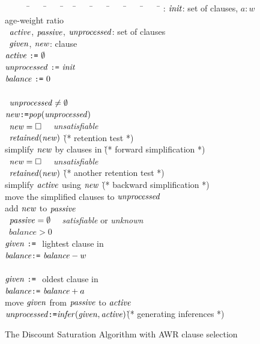 \documentclass{llncs}
\newcommand{\Balance}{\ensuremath{\mathit{balance}}}
\begin{document}
\begin{figure}
\begin{tabbing}
~~~~~~\=~~~~\=~~~~\=~~~\=~~~~\=~~~~\=~~~~\=~~~~\=~~~~\=\kill
\>\INPUT: $\mathit{init}$: set of clauses\semicol, $a:w$ age-weight ratio \\
\>\VAR\ $\mathit{active}$, $\mathit{passive}$, $\mathit{unprocessed}$: set of clauses\semicol \\
\>\VAR\ $\mathit{given}$, $\mathit{new}$: clause\semicol\\
\>$\mathit{active}\ \texttt{:=}\ \emptyset$\semicol \\
\>$\mathit{unprocessed}\ \texttt{:=}\ \mathit{init}$\semicol \\
\Mark
\>$\Balance\ \assign\ 0$\semicol\\
\>\LOOP\\ 
\>\>\WHILE\ $\mathit{unprocessed} \neq \emptyset$ \\
\>\>\>$\mathit{new} \texttt{:=} \mathit{pop}(\mathit{unprocessed})$\semicol \\ 
\>\>\>\IF\ $\mathit{new} = \Box$ \THEN\ \RETURN\ \textit{unsatisfiable}\semicol \\
\>\>\>\IF\ $\mathit{retained}(\mathit{new})$ \THEN \` (* retention test *) \\ %
\>\>\>\>simplify $\mathit{new}$ by clauses in \Active \semicol 
                        \` (* forward simplification *) \\
\>\>\>\>\IF\ $\mathit{new} = \Box$ \THEN\ \RETURN\ \textit{unsatisfiable}\semicol \\
\>\>\>\>\IF\ $\mathit{retained}(\mathit{new})$ \THEN
                        \` (* another retention test *) \\
\>\>\>\>\>simplify $\mathit{active}$ using $\mathit{new}$ \semicol
                        \` (* backward simplification *) \\
\>\>\>\>\>move the simplified clauses to $\mathit{unprocessed}$\semicol \\
\>\>\>\>\>add $\mathit{new}$ to $\mathit{passive}$\\ %
\>\>\IF\ $\mathit{passive} = \emptyset$ \THEN\
          \RETURN\ \textit{satisfiable} or \textit{unknown}\\
\Mark
\>\>\IF\ $\Balance > 0$ \THEN\\
\Mark
\>\>\>\>$\mathit{given}\ \texttt{:=}\ $ lightest clause in \Passive\semicol\\
\Mark
\>\>\>\>$\Balance \assign\ \Balance - w$\semicol\\
\Mark
\>\>\ELSE\\
\Mark
\>\>\>\>$\mathit{given}\ \texttt{:=}\ $ oldest clause in \Passive\semicol\\
\Mark
\>\>\>\>$\Balance \assign\ \Balance + a$\semicol\\
\>\>move $\mathit{given}$ from $\mathit{passive}$ to $\mathit{active}$\semicol \\
\>\>$\mathit{unprocessed} \texttt{:=} \mathit{infer}(\mathit{given},\mathit{active})$\semicol \` (* generating inferences *)\\
\end{tabbing}

                \caption{The Discount Saturation Algorithm with AWR clause selection
	        \label{fig:discount}}

\end{figure}
\end{document}

